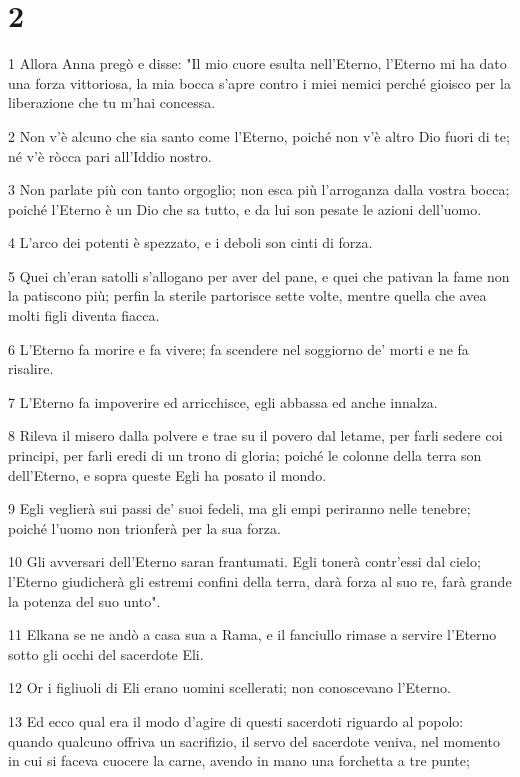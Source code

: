 \chapter{2}

\par 1 Allora Anna pregò e disse: "Il mio cuore esulta nell'Eterno, l'Eterno mi ha dato una forza vittoriosa, la mia bocca s'apre contro i miei nemici perché gioisco per la liberazione che tu m'hai concessa.
\par 2 Non v'è alcuno che sia santo come l'Eterno, poiché non v'è altro Dio fuori di te; né v'è ròcca pari all'Iddio nostro.
\par 3 Non parlate più con tanto orgoglio; non esca più l'arroganza dalla vostra bocca; poiché l'Eterno è un Dio che sa tutto, e da lui son pesate le azioni dell'uomo.
\par 4 L'arco dei potenti è spezzato, e i deboli son cinti di forza.
\par 5 Quei ch'eran satolli s'allogano per aver del pane, e quei che pativan la fame non la patiscono più; perfin la sterile partorisce sette volte, mentre quella che avea molti figli diventa fiacca.
\par 6 L'Eterno fa morire e fa vivere; fa scendere nel soggiorno de' morti e ne fa risalire.
\par 7 L'Eterno fa impoverire ed arricchisce, egli abbassa ed anche innalza.
\par 8 Rileva il misero dalla polvere e trae su il povero dal letame, per farli sedere coi principi, per farli eredi di un trono di gloria; poiché le colonne della terra son dell'Eterno, e sopra queste Egli ha posato il mondo.
\par 9 Egli veglierà sui passi de' suoi fedeli, ma gli empi periranno nelle tenebre; poiché l'uomo non trionferà per la sua forza.
\par 10 Gli avversari dell'Eterno saran frantumati. Egli tonerà contr'essi dal cielo; l'Eterno giudicherà gli estremi confini della terra, darà forza al suo re, farà grande la potenza del suo unto".
\par 11 Elkana se ne andò a casa sua a Rama, e il fanciullo rimase a servire l'Eterno sotto gli occhi del sacerdote Eli.
\par 12 Or i figliuoli di Eli erano uomini scellerati; non conoscevano l'Eterno.
\par 13 Ed ecco qual era il modo d'agire di questi sacerdoti riguardo al popolo: quando qualcuno offriva un sacrifizio, il servo del sacerdote veniva, nel momento in cui si faceva cuocere la carne, avendo in mano una forchetta a tre punte;
